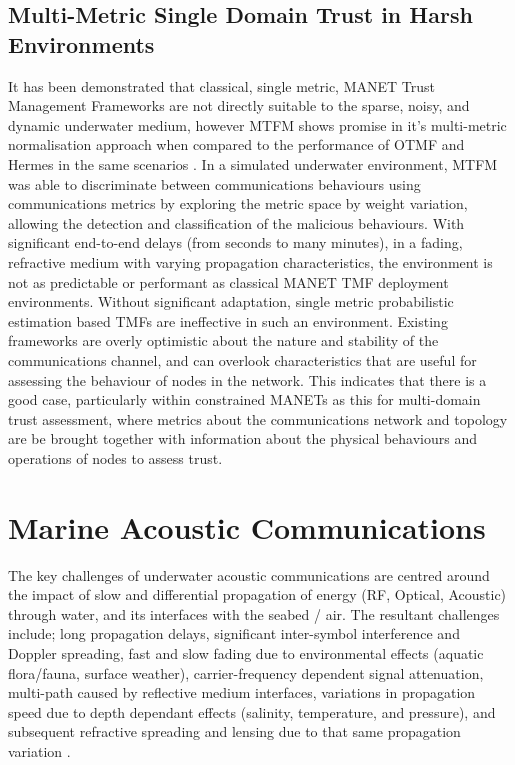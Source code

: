 \documentclass{aamas2016}
\begin{document}
\subsection{Multi-Metric Single Domain Trust in Harsh Environments}

It has been demonstrated that classical, single metric, MANET Trust Management Frameworks are not directly suitable to the sparse, noisy, and dynamic underwater medium, however MTFM shows promise in it's multi-metric normalisation approach when compared to the performance of OTMF and Hermes in the same scenarios \cite{Bolster2015}.
In a simulated underwater environment, MTFM was able to discriminate between communications behaviours using communications metrics by exploring the metric space by weight variation, allowing the detection and classification of the malicious behaviours.
With significant end-to-end delays (from seconds to many minutes), in a fading, refractive medium with varying propagation characteristics, the environment is not as predictable or performant as classical MANET TMF deployment environments. 
Without significant adaptation, single metric probabilistic estimation based TMFs are ineffective in such an environment.
Existing frameworks are overly optimistic about the nature and stability of the communications channel, and can overlook characteristics that are useful for assessing the behaviour of nodes in the network. 
This indicates that there is a good case, particularly within constrained MANETs as this for multi-domain trust assessment, where metrics about the communications network and topology are be brought together with information about the physical behaviours and operations of nodes to assess trust.


\section{Marine Acoustic Communications}

The key challenges of underwater acoustic communications are centred around the impact of slow and differential propagation of energy (RF, Optical, Acoustic) through water, and its interfaces with the seabed / air.
The resultant challenges include; long propagation delays, significant inter-symbol interference and Doppler spreading, fast and slow fading due to environmental effects (aquatic flora/fauna, surface weather), carrier-frequency dependent signal attenuation, multi-path caused by reflective medium interfaces, variations in propagation speed due to depth dependant effects (salinity, temperature, and pressure), and subsequent refractive spreading and lensing due to that same propagation variation \cite{Partan2006}.
\end{document}
